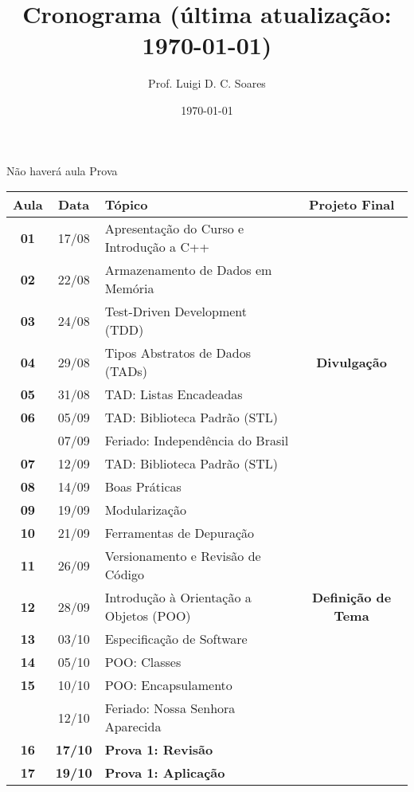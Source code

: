 \documentclass[11pt]{article}
\author{Prof. Luigi D. C. Soares}
\date{\today}
\title{Cronograma (\color{red}\bfseries última atualização: \today\color{black})}
\begin{document}
\begin{center}
    \Large\bfseries\thetitle{}
\end{center}

\begin{center}
    \quad Não haverá aula \qquad
    \quad Prova
\end{center}

\begin{center}
\begin{tabular}{>{\bfseries}ccl>{\bfseries}c}
\toprule
\textbf{Aula} & \textbf{Data} & \textbf{Tópico} & \textbf{Projeto Final}\\[0pt]
\midrule
01 & 17/08 & Apresentação do Curso e Introdução a C++ & \\[0pt]
02 & 22/08 & Armazenamento de Dados em Memória & \\[0pt]
03 & 24/08 & Test-Driven Development (TDD) & \\[0pt]
04 & 29/08 & Tipos Abstratos de Dados (TADs) & Divulgação\\[0pt]
05 & 31/08 & TAD: Listas Encadeadas & \\[0pt]
06 & 05/09 & TAD: Biblioteca Padrão (STL) & \\[0pt]
\rowcolor{green!40} & 07/09 & Feriado: Independência do Brasil & \\[0pt]
07 & 12/09 & TAD: Biblioteca Padrão (STL) & \\[0pt]
08 & 14/09 & Boas Práticas & \\[0pt]
09 & 19/09 & Modularização & \\[0pt]
10 & 21/09 & Ferramentas de Depuração & \\[0pt]
11 & 26/09 & Versionamento e Revisão de Código & \\[0pt]
12 & 28/09 & Introdução à Orientação a Objetos (POO) & Definição de Tema\\[0pt]
13 & 03/10 & Especificação de Software & \\[0pt]
14 & 05/10 & POO: Classes & \\[0pt]
15 & 10/10 & POO: Encapsulamento & \\[0pt]
\rowcolor{green!40} & 12/10 & Feriado: Nossa Senhora Aparecida & \\[0pt]
\rowcolor{yellow!50} 16 & \textbf{17/10} & \textbf{Prova 1: Revisão} & \\[0pt]
\rowcolor{yellow!50} 17 & \textbf{19/10} & \textbf{Prova 1: Aplicação} & \\[0pt]

\end{tabular}
\end{center}
\end{document}
